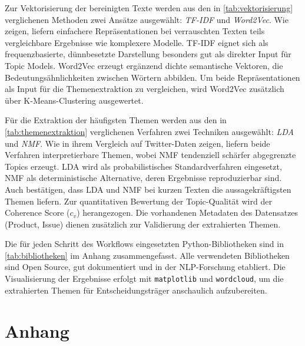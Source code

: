 \documentclass[a4paper,11pt]{article}
\begin{document}
Zur Vektorisierung der bereinigten Texte werden aus den in \cref{tab:vektorisierung} verglichenen
Methoden zwei Ansätze ausgewählt: \textit{TF-IDF} und \textit{Word2Vec}. Wie \textcite[S.~213]{wang2020empirical}
zeigen, liefern einfachere Repräsentationen bei verrauschten Texten teils vergleichbare Ergebnisse wie
komplexere Modelle. TF-IDF eignet sich als frequenzbasierte, dünnbesetzte Darstellung besonders gut
als direkter Input für Topic Models. Word2Vec erzeugt ergänzend dichte semantische Vektoren,
die Bedeutungsähnlichkeiten zwischen Wörtern abbilden. Um beide Repräsentationen als Input für die
Themenextraktion zu vergleichen, wird Word2Vec zusätzlich über K-Means-Clustering ausgewertet.

Für die Extraktion der häufigsten Themen werden aus den in \cref{tab:themenextraktion} verglichenen
Verfahren zwei Techniken ausgewählt: \textit{LDA} und \textit{NMF}. Wie \textcite[S.~11]{egger2022topic} in
ihrem Vergleich auf Twitter-Daten zeigen, liefern beide Verfahren interpretierbare Themen, wobei NMF
tendenziell schärfer abgegrenzte Topics erzeugt. LDA wird als probabilistisches Standardverfahren
eingesetzt, NMF als deterministische Alternative, deren Ergebnisse reproduzierbar sind.
Auch \textcite[S.~1, 15]{albalawi2020topic} bestätigen, dass LDA und NMF bei kurzen Texten die aussagekräftigsten
Themen liefern. Zur quantitativen Bewertung der Topic-Qualität wird der Coherence Score ($c_v$) herangezogen.
Die vorhandenen Metadaten des Datensatzes (Product, Issue) dienen zusätzlich zur Validierung
der extrahierten Themen.

Die für jeden Schritt des Workflows eingesetzten Python-Bibliotheken sind in
\cref{tab:bibliotheken} im Anhang zusammengefasst. Alle verwendeten Bibliotheken sind
Open Source, gut dokumentiert und in der NLP-Forschung etabliert. Die Visualisierung
der Ergebnisse erfolgt mit \texttt{matplotlib} und \texttt{wordcloud}, um die extrahierten
Themen für Entscheidungsträger anschaulich aufzubereiten.

\newpage
\printbibliography[title=Literaturverzeichnis]

\newpage
\appendix
\section*{Anhang}
\end{document}
